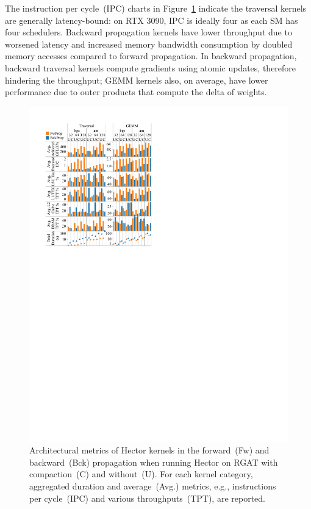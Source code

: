 The instruction per cycle~(IPC) charts in Figure~\ref{fig:arch_number} indicate the traversal kernels are generally latency-bound: on RTX 3090, IPC is ideally four as each SM has four schedulers. Backward propagation kernels have lower throughput due to worsened latency and increased memory bandwidth consumption by doubled memory accesses compared to forward propagation. In backward propagation, backward traversal kernels compute gradients using atomic updates, therefore hindering the throughput; GEMM kernels also, on average, have lower performance due to outer products that compute the delta of weights.





\begin{figure}[!htbp]
\centering
\includegraphics[width=0.8\linewidth]{figures/Hector/upd6_Aggregated.HGT.AM.MAG.Arch_number_portrait_fw_bw_compact.pdf}
\caption{\label{fig:arch_number}Architectural metrics of Hector kernels in the forward~(Fw) and backward~(Bck) propagation when running Hector on RGAT with compaction~(C) and without~(U). For each kernel category, aggregated duration and average~(Avg.) metrics, e.g., instructions per cycle~(IPC) and various throughputs~(TPT), are reported.}
\end{figure}






